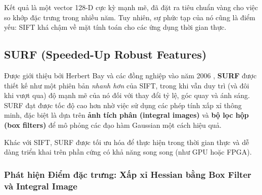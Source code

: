 Kết quả là một vector 128-D cực kỳ mạnh mẽ, đã đặt ra tiêu chuẩn vàng cho việc so khớp đặc trưng trong nhiều năm. Tuy nhiên, sự phức tạp của nó cũng là điểm yếu: SIFT khá chậm về mặt tính toán cho các ứng dụng thời gian thực.

\subsection{SURF (Speeded-Up Robust Features)}
\label{subsec:surf}

Được giới thiệu bởi Herbert Bay và các đồng nghiệp vào năm 2006 \cite{Bay2006}, \textbf{SURF} được thiết kế như một phiên bản \textit{nhanh hơn} của SIFT, trong khi vẫn duy trì (và đôi khi vượt qua) độ mạnh mẽ của nó đối với thay đổi tỷ lệ, góc quay và ánh sáng. SURF đạt được tốc độ cao hơn nhờ việc sử dụng các phép tính xấp xỉ thông minh, đặc biệt là dựa trên \textbf{ảnh tích phân (integral images)} và \textbf{bộ lọc hộp (box filters)} để mô phỏng các đạo hàm Gaussian một cách hiệu quả.

Khác với SIFT, SURF được tối ưu hóa để thực hiện trong thời gian thực và dễ dàng triển khai trên phần cứng có khả năng song song (như GPU hoặc FPGA).

\subsubsection{Phát hiện Điểm đặc trưng: Xấp xỉ Hessian bằng Box Filter và Integral Image}
\label{subsubsec:surf_detection}

